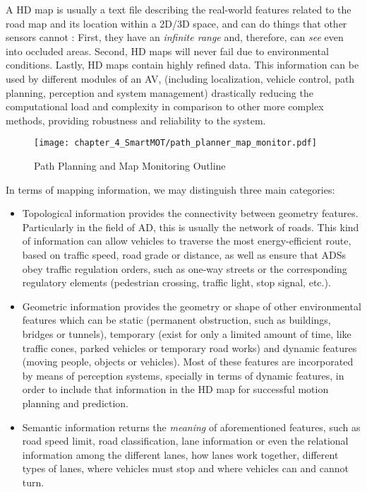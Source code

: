 A HD map is usually a text file describing the real-world features related to the road map and its location within a 2D/3D space, and can do things that other sensors cannot \cite{wong2020mapping}: First, they have an \textit{infinite range} and, therefore, can \textit{see} even into occluded areas. Second, HD maps will never fail due to environmental conditions. Lastly, HD maps contain highly refined data. This information can be used by different modules of an AV, (including localization, vehicle control, path planning, perception and system management) drastically reducing the computational load and complexity in comparison to other more complex methods, providing robustness and reliability to the system.

\begin{figure}[] 
	\centering
	\texttt{[image: chapter\_4\_SmartMOT/path\_planner\_map\_monitor.pdf]}
	\caption{Path Planning and Map Monitoring Outline}
	\label{fig:chapter_4_SmartMOT/path_planner_map_monitor}
\end{figure}

In terms of mapping information, we may distinguish three main categories:

\begin{itemize}
	\item Topological information provides the connectivity between geometry features. Particularly in the field of \ac{AD}, this is usually the network of roads. This kind of information can allow vehicles to traverse the most energy-efficient route, based on traffic speed, road grade or distance, as well as ensure that \acp{ADS} obey traffic regulation orders, such as one-way streets or the corresponding regulatory elements (pedestrian crossing, traffic light, stop signal, etc.).
	\item Geometric information provides the geometry or shape of other environmental features which can be static (permanent obstruction, such as buildings, bridges or tunnels), temporary (exist for only a limited amount of time, like traffic cones, parked vehicles or temporary road works) and dynamic features (moving people, objects or vehicles). Most of these features are incorporated by means of perception systems, specially in terms of dynamic features, in order to include that information in the HD map for successful motion planning and prediction.
	\item Semantic information returns the \textit{meaning} of aforementioned features, such as road speed limit, road classification, lane information or even the relational information among the different lanes, \ie how lanes work together, different types of lanes, where vehicles must stop and where vehicles can and cannot turn.
\end{itemize}

